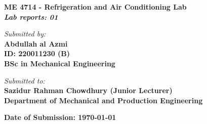 \begin{titlepage}
	\begin{center}
		{\Huge \textbf{ ME 4714 - Refrigeration and Air Conditioning Lab}} \\
		\vspace{1cm}
		\Large{\textbf{\textit{Lab reports: 01}}} \\

		\vfill

		\textit{\large Submitted by:} \\
		\vspace{0.3cm}
		\textbf{Abdullah al Azmi} \\
		\textbf{ID: 220011230 (B)} \\
		\textbf{BSc in Mechanical Engineering} \\

		\vfill

		\textit{\large Submitted to:} \\
		\vspace{0.3cm}
		\textbf{\Large Sazidur Rahman Chowdhury (Junior Lecturer)} \\
		\textbf{Department of Mechanical and Production Engineering} \\

		\vfill

		\textbf{Date of Submission: \today}
		\vspace*{1cm}
	\end{center}
\end{titlepage}